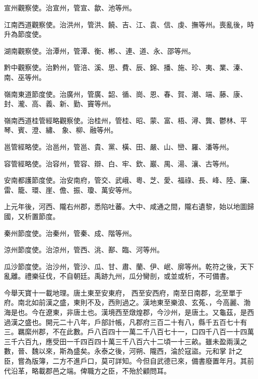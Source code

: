 \begin{pinyinscope}
 宣州觀察使。治宣州，管宣、歙、池等州。



 江南西道觀察使。治洪州，管洪、饒、吉、江、袁、信、虔、撫等州。喪亂後，時升為節度使。



 湖南觀察使。治潭州，管潭、衡、郴、、連、道、永、邵等州。



 黔中觀察使。治黔州，管涪、溪、思、費、辰、錦、播、施、珍、夷、業、溱、南、巫等州。



 嶺南東道節度使。治廣州，管廣、韶、循、崗、恩、春、賀、潮、端、藤、康、封、瀧、高、義、新、勤、竇等州。



 嶺南西道桂管經略觀察使。治桂州，管桂、昭、蒙、富、梧、潯、龔、鬱林、平琴、賓、澄、繡、
 象、柳、融等州。



 邕管經略使。治邕州，管邕、貴、黨、橫、田、嚴、山、巒、羅、潘等州。



 容管經略使。治容州，管容、辯、白、牢、欽、巖、禺、湯、瀼、古等州。



 安南都護節度使。治安南府，管交、武峨、粵、芝、愛、福祿、長、峰、陸、廉、雷、籠、環、崖、儋、振、瓊、萬安等州。



 上元年後，河西、隴右州郡，悉陷吐蕃。大中、咸通之間，隴右遺黎，始以地圖歸國，又析置節度。



 秦州節度使。治秦州，管秦、成、階等州。



 涼州節度使。治涼州，管西、洮、鄯、臨、河等州。



 瓜沙節度使。治沙州，管沙、瓜、甘、肅、蘭、伊、岷、廓等州。乾符之後，天下亂離。禮樂征伐，不自朝廷。禹跡九州，瓜分臠剖，或並或析，不可備書。



 今舉天寶十一載地理。唐土東至安東府，
 西至安西府，南至日南郡，北至單于府。南北如前漢之盛，東則不及，西則過之。漢地東至樂浪、玄菟、，今高麗、渤海是也。今在遼東，非唐土也。漢境西至燉煌郡，今沙州，是唐土。又龜茲，是西過漢之盛也。開元二十八年，戶部計帳，凡郡府三百二十有八，縣千五百七十有三。羈縻州郡，不在此數。戶八百四十一萬二千八百七十一，口四千八百一十四萬三千六百九，應受田一千四百四十萬三千八百六十二頃一十三畝。雖未盈兩漢之數，晉、魏以來，斯為盛矣。永泰之後，河朔、隴西，淪於寇盜。元和掌
 計之臣，嘗為版簿，二方不進戶口，莫可詳知。今但自武德已來，備書廢置年月。其前代沿革，略載郡邑之端。俾職方之臣，不殆於顧問耳。




\end{pinyinscope}
